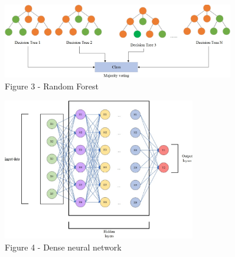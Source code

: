 \begin{figure}[H]
	\centering
	\includegraphics[width=0.9\textwidth]{media/ict/image40}
	\caption*{Figure 3 - Random Forest}
\end{figure}

\begin{figure}[H]
	\centering
	\includegraphics[width=0.75\textwidth]{media/ict/image44}
	\caption*{Figure 4 - Dense neural network}
\end{figure}

